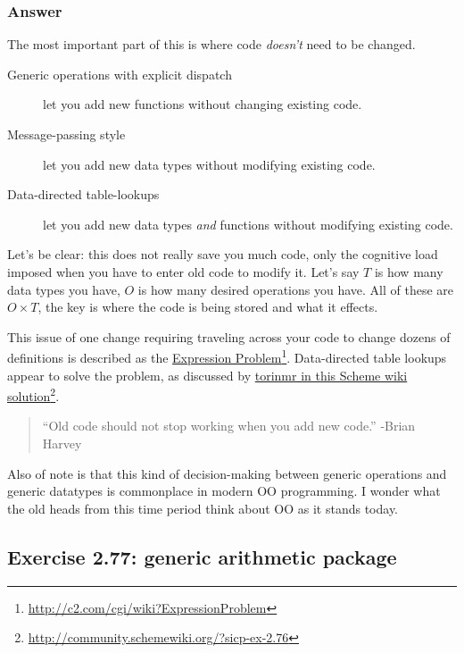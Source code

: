 \documentclass[final,fleqn,titlepage,twoside]{article}
\begin{document}
\subsubsection{Answer}
\label{sec:org841c430}
The most important part of this is where code \emph{doesn't} need to be changed.

\begin{description}
\item[{Generic operations with explicit dispatch}] let you add new functions without
changing existing code.
\item[{Message-passing style}] let you add new data types without modifying existing
code.
\item[{Data-directed table-lookups}] let you add new data types \emph{and} functions
without modifying existing code.
\end{description}

Let's be clear: this does not really save you much code, only the cognitive load
imposed when you have to enter old code to modify it. Let's say \(T\) is how
many data types you have, \(O\) is how many desired operations you have. All of
these are \(O\times T\), the key is where the code is being stored and what it
effects.

This issue of one change requiring traveling across your code to change dozens
of definitions is described as the \href{http://c2.com/cgi/wiki?ExpressionProblem}{Expression Problem}\footnote{\url{http://c2.com/cgi/wiki?ExpressionProblem}}. Data-directed table lookups appear to
solve the problem, as discussed by \href{http://community.schemewiki.org/?sicp-ex-2.76}{torinmr in this Scheme wiki solution}\footnote{\url{http://community.schemewiki.org/?sicp-ex-2.76}}.

\begin{quote}
``Old code should not stop working when you add new code.'' -Brian Harvey
\end{quote}

Also of note is that this kind of decision-making between generic operations and
generic datatypes is commonplace in modern OO programming. I wonder what the old
heads from this time period think about OO as it stands today.

\subsection{Exercise 2.77: generic arithmetic package}
\label{sec:orgc38157c}
\end{document}
